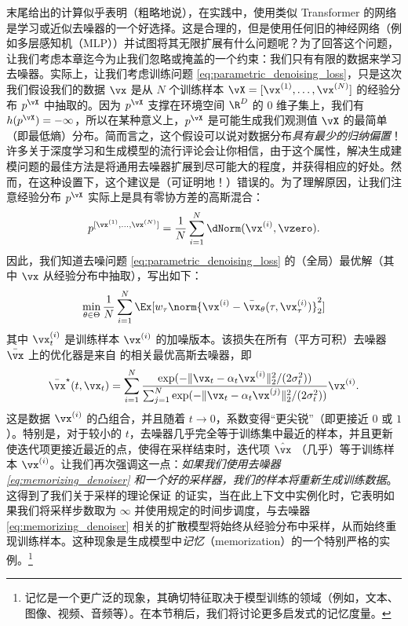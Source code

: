 \documentclass[../../book-main_zh.tex]{subfiles}
\begin{document}
 末尾给出的计算似乎表明（粗略地说），在实践中，使用类似 Transformer 的网络是学习或近似去噪器的一个好选择。这是合理的，但是使用任何旧的神经网络（例如多层感知机（MLP））并试图将其无限扩展有什么问题呢？为了回答这个问题，让我们考虑本章迄今为止我们忽略或掩盖的一个约束：我们只有有限的数据来学习去噪器。实际上，让我们考虑训练问题 \eqref{eq:parametric_denoising_loss}，只是这次我们假设我们的数据 \(\vx\) 是从 \(N\) 个训练样本
\(\vX = [\vx^{(1)}, \dots, \vx^{(N)}]\) 的经验分布 \(p^{\vX}\) 中抽取的。因为 \(p^{\vX}\) 支撑在环境空间 \(\R^{D}\) 的 \(0\) 维子集上，我们有 \(h(p^{\vX}) = -\infty\)，所以在某种意义上，\(p^{\vX}\) 是可能生成我们观测值 \(\vX\) 的最简单（即最低熵）分布。简而言之，这个假设可以说对数据分布\textit{具有最少的归纳偏置}！许多关于深度学习和生成模型的流行评论会让你相信，由于这个属性，解决生成建模问题的最佳方法是将通用去噪器扩展到尽可能大的程度，并获得相应的好处。然而，在这种设置下，这个建议是（可证明地！）错误的。为了理解原因，让我们注意经验分布 \(p^{\vX}\) 实际上是具有零协方差的高斯混合：
\begin{equation}
    p^{[\vx^{(1)}, \dots, \vx^{(N)}]} = \frac{1}{N}\sum_{i =
    1}^{N}\dNorm(\vx^{(i)}, \vzero).
\end{equation}
因此，我们知道去噪问题 \eqref{eq:parametric_denoising_loss} 的（全局）最优解（其中 \(\vx\) 从经验分布中抽取），写出如下：
\begin{equation}\label{eq:parametric_denoising_loss_finite_sample}
    \min_{\theta \in \Theta}\frac{1}{N}\sum_{i =
    1}^{N}\Ex[w_{\tau}\norm{\vx^{(i)} - \bar{\vx}_{\theta}(\tau,
    \vx_{\tau}^{(i)})}_{2}^{2}]
\end{equation}
其中 \(\vx_{t}^{(i)}\) 是训练样本 \(\vx^{(i)}\) 的加噪版本。该损失在所有（平方可积）去噪器 \(\bar{\vx}\) 上的优化器是来自  的相关最优高斯去噪器，即
\begin{equation}\label{eq:memorizing_denoiser}
    \bar{\vx}^{\star}(t, \vx_{t}) = \sum_{i =
    1}^{N}\frac{\exp({-\|\vx_{t} -
    \alpha_{t}\vx^{(i)}\|_{2}^{2}/(2\sigma_{t}^{2})})}{\sum_{j =
        1}^{N}\exp({-\|\vx_{t} -
    \alpha_{t}\vx^{(j)}\|_{2}^{2}/(2\sigma_{t}^{2})})}\vx^{(i)}.
\end{equation}
这是数据 \(\vx^{(i)}\) 的凸组合，并且随着 \(t \to 0\)，系数变得“更尖锐”（即更接近 \(0\) 或 \(1\)）。特别是，对于较小的 \(t\)，去噪器几乎完全等于训练集中最近的样本，并且更新使迭代项更接近最近的点，使得在采样结束时，迭代项 \(\hat{\vx}\) （几乎）等于训练样本 \(\vx^{(i)}\)。让我们再次强调这一点：\textit{如果我们使用去噪器 \eqref{eq:memorizing_denoiser} 和一个好的采样器，我们的样本将重新生成训练数据}。这得到了我们关于采样的理论保证  的证实，当在此上下文中实例化时，它表明如果我们将采样步数取为 \(\infty\) 并使用规定的时间步调度，与去噪器 \eqref{eq:memorizing_denoiser} 相关的扩散模型将始终从经验分布中采样，从而始终重现训练样本。这种现象是生成模型中\textit{记忆}（memorization）的一个特别严格的实例。\footnote{记忆是一个更广泛的现象，其确切特征取决于模型训练的领域（例如，文本、图像、视频、音频等）。在本节稍后，我们将讨论更多启发式的记忆度量。}
\end{document}
